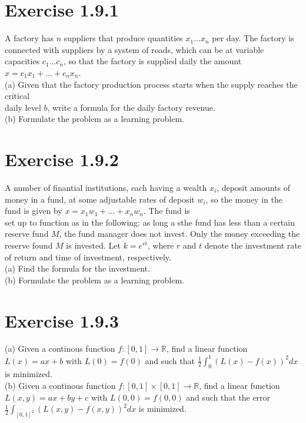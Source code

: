 \documentclass{report}
\begin{document}
\section*{Exercise 1.9.1}


A factory has $n$ suppliers that produce quantities $x_1 \dots x_n$ per day. The factory is connected with suppliers by a system of roads, which
can be at variable capacities $c_1 \dots c_n$, so that the factory is supplied
daily the amount $x = c_1 x_1 + \dots + c_n x_n$.\\
(a) Given that the factory production process starts when the supply reaches the critical \\ 
daily level $b$, write a formula for the daily factory revenue.\\
(b) Formulate the problem as a learning problem.

\section*{Exercise 1.9.2}


A number of finantial institutions, each having a wealth $x_i$, deposit amounts of money in a fund, at some adjustable rates of 
deposit $w_i$, so the money in the fund is given by $x = x_1 w_1 + \dots + x_n w_n$. The fund is \\
set up to function as in the following: as long a sthe fund has less than a certain reserve fund $M$, the fund manager does not invest. Only the
money exceeding the reserve found $M$ is invested. Let $k = e ^ {r t}$, where $r$ and $t$ denote the investment rate of return and time of investment, respectively.\\
(a) Find the formula for the investment. \\
(b) Formulate the problem as a learning problem.

\section*{Exercise 1.9.3}


(a) Given a continous function $f: [0,1] \rightarrow \mathbb{R}$, find a linear function $L(x) = ax + b$ with $L(0) = f(0)$ and such that 
$\frac{1}{2} \int^{1}_{0}(L(x) - f(x))^2 dx$ is minimized.\\
(b) Given a continous function $f: [0,1] \times [0,1] \rightarrow \mathbb{R}$, find a linear function $L(x,y) = ax + by + c$ with $L(0,0) = f(0,0)$ and 
such that the error $\frac{1}{2} \int_{[0,1]^2}(L(x,y) - f(x,y))^2 dx$ is minimized.
\end{document}
